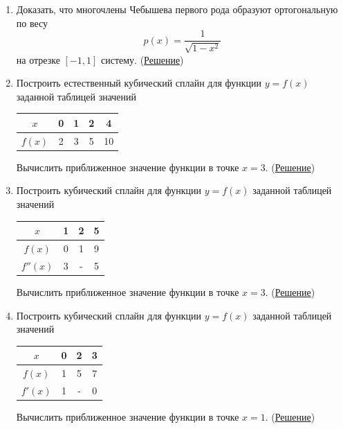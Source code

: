 \documentclass[a4paper, 12pt]{article}
\begin{document}
\begin{enumerate}
		\item Доказать, что многочлены Чебышева первого рода образуют ортогональную по весу $$p(x)=\dfrac{1}{\sqrt{1-x^2}}$$ на отрезке $[-1, 1]$ систему. (\hyperlink{t10}{Решение})
		\item Построить естественный кубический сплайн для функции $y = f(x)$ заданной таблицей значений 
		\begin{center}\begin{tabular}[t]{|c|c|c|c|c|}
				\hline
				$x$ & 0 & 1 & 2 & 4 \\
				\hline
				$f(x)$ & 2 & 3 & 5 & 10 \\
				\hline
		\end{tabular}\end{center}
		Вычислить приближенное значение функции в точке $x=3$. (\hyperlink{t11}{Решение})
		
		\item Построить кубический сплайн для функции $y = f(x)$ заданной таблицей значений 
		\begin{center}\begin{tabular}[t]{|c|c|c|c|}
				\hline
				$x$ & 1 & 2 & 5 \\
				\hline
				$f(x)$ & 0 & 1 & 9 \\
				\hline
				$f''(x)$ & 3 & - & 5 \\
				\hline
		\end{tabular}\end{center}
		Вычислить приближенное значение функции в точке $x=3$. (\hyperlink{t12}{Решение})
		
		\item 
		Построить кубический сплайн для функции $y = f(x)$ заданной таблицей значений 
		\begin{center}\begin{tabular}[t]{|c|c|c|c|}
				\hline
				$x$ & 0 & 2 & 3 \\
				\hline
				$f(x)$ & 1 & 5 & 7 \\
				\hline
				$f'(x)$ & 1 & - & 0 \\
				\hline
		\end{tabular}\end{center}
		Вычислить приближенное значение функции в точке $x=1$. (\hyperlink{t13}{Решение})
	\end{enumerate}
	
	\newpage
\end{document}

